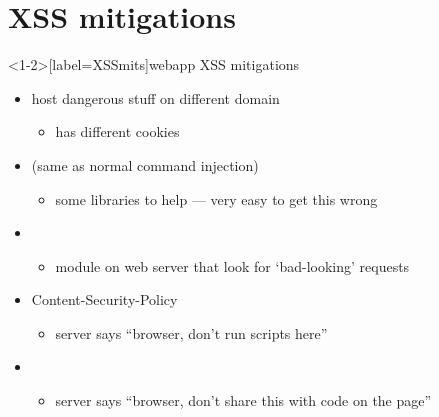 
\section{XSS mitigations}

\begin{frame}<1-2>[label=XSSmits]{webapp XSS mitigations}
    \begin{itemize}
    \item host dangerous stuff on different domain
        \begin{itemize}
        \item has different cookies
        \end{itemize}
    \item {} (same as normal command injection)
        \begin{itemize}
        \item some libraries to help --- very easy to get this wrong
        \end{itemize}
    \item {}
        \begin{itemize}
        \item module on web server that look for `bad-looking' requests
        \end{itemize}
    \item Content-Security-Policy
        \begin{itemize}
        \item server says ``browser, don't run scripts here''
        \end{itemize}
    \item {}
        \begin{itemize}
        \item server says ``browser, don't share this with code on the page''
        \end{itemize}
    \end{itemize}
\end{frame}


